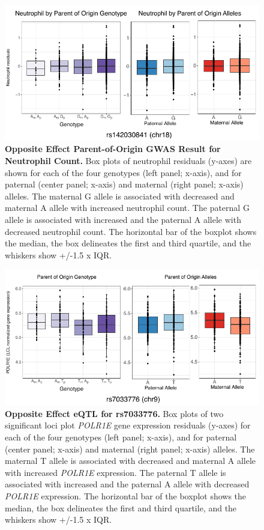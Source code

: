 \begin{figure}[!htb]
\centering
\includegraphics[width=5in]{img/ch02/fig-s14.pdf}
\caption[Opposite Effect Parent-of-Origin GWAS Result for Neutrophil Count.]{\textbf{Opposite Effect Parent-of-Origin GWAS Result for Neutrophil Count.}  Box plots of neutrophil residuals (y-axes) are shown for each of the four genotypes (left panel; x-axis), and for paternal (center panel; x-axis) and maternal (right panel; x-axis) alleles. The maternal G allele is associated with decreased and maternal A allele with increased neutrophil count. The paternal G allele is associated with increased and the paternal A allele with decreased neutrophil count. The horizontal bar of the boxplot shows the median, the box delineates the first and third quartile, and the whiskers show +/-1.5 x IQR.}
\label{fig:fig-s14}
\end{figure}






\begin{figure}[!htb]
\centering
\includegraphics[width=5in]{img/ch02/fig-s15.pdf}
\caption[Opposite Effect eQTL for rs7033776.]{\textbf{Opposite Effect eQTL for rs7033776.} Box plots of two significant loci plot \emph{POLR1E} gene expression residuals (y-axes) for each of the four genotypes (left panel; x-axis), and for paternal (center panel; x-axis) and maternal (right panel; x-axis) alleles. The maternal T allele is associated with decreased and maternal A allele with increased \emph{POLR1E} expression. The paternal T allele is associated with increased and the paternal A allele with decreased \emph{POLR1E} expression. The horizontal bar of the boxplot shows the median, the box delineates the first and third quartile, and the whiskers show +/-1.5 x IQR.}
\label{fig:fig-s15}
\end{figure}



